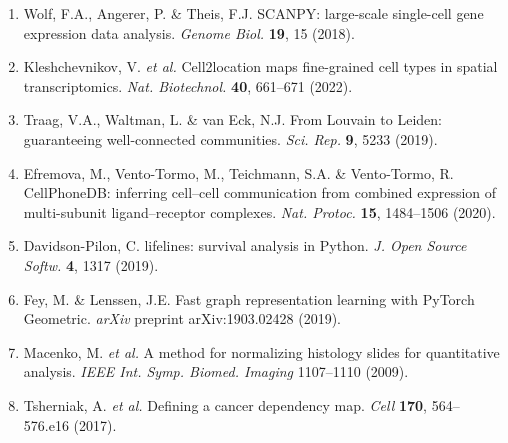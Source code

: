 \documentclass[11pt,a4paper]{article}
\begin{document}
\begin{enumerate}
    \item Wolf, F.A., Angerer, P. \& Theis, F.J. SCANPY: large-scale single-cell gene expression data analysis. \textit{Genome Biol.} \textbf{19}, 15 (2018).
    
    \item Kleshchevnikov, V. \textit{et al.} Cell2location maps fine-grained cell types in spatial transcriptomics. \textit{Nat. Biotechnol.} \textbf{40}, 661--671 (2022).
    
    \item Traag, V.A., Waltman, L. \& van Eck, N.J. From Louvain to Leiden: guaranteeing well-connected communities. \textit{Sci. Rep.} \textbf{9}, 5233 (2019).
    
    \item Efremova, M., Vento-Tormo, M., Teichmann, S.A. \& Vento-Tormo, R. CellPhoneDB: inferring cell--cell communication from combined expression of multi-subunit ligand--receptor complexes. \textit{Nat. Protoc.} \textbf{15}, 1484--1506 (2020).
    
    \item Davidson-Pilon, C. lifelines: survival analysis in Python. \textit{J. Open Source Softw.} \textbf{4}, 1317 (2019).
    
    \item Fey, M. \& Lenssen, J.E. Fast graph representation learning with PyTorch Geometric. \textit{arXiv} preprint arXiv:1903.02428 (2019).
    
    \item Macenko, M. \textit{et al.} A method for normalizing histology slides for quantitative analysis. \textit{IEEE Int. Symp. Biomed. Imaging} 1107--1110 (2009).
    
    \item Tsherniak, A. \textit{et al.} Defining a cancer dependency map. \textit{Cell} \textbf{170}, 564--576.e16 (2017).
\end{enumerate}
\end{document}
